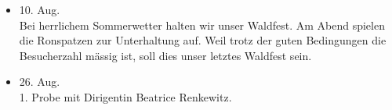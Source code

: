 \begin{history}
\begin{itemize}
        \item 10. Aug.\\
              Bei herrlichem Sommerwetter halten wir unser Waldfest. Am Abend spielen
              die Ronspatzen zur Unterhaltung auf. Weil trotz der guten Bedingungen
              die Besucherzahl mässig ist, soll dies unser letztes Waldfest sein.

        \item 26. Aug.\\
              1. Probe mit Dirigentin Beatrice Renkewitz.


    \end{itemize}

\end{history}
